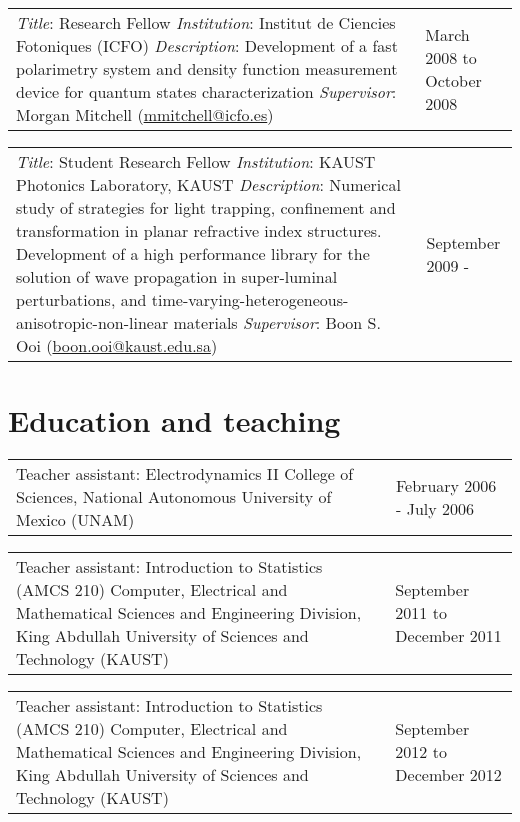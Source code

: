 \documentclass[margin,10pt]{res}
\newcommand{\subs}[1]{\normalfont #1}
\newcommand{\secs}[1]{\normalsize{\section{\subs{#1}}}}
\newcommand{\UNAM}{National Autonomous University of Mexico (UNAM)}
\newcommand{\KAUST}{King Abdullah University of Sciences and Technology (KAUST)}
\begin{document}
\begin{tabular}{p{3.8in} l}
 \emph{Title}: Research Fellow \newline  \emph{Institution}: Institut de Ciencies Fotoniques (ICFO) \newline \emph{Description}: Development of a fast polarimetry system and density function measurement device for quantum states characterization \newline \emph{Supervisor}: Morgan Mitchell (\href{mailto:mmitchell@icfo.es}{mmitchell@icfo.es}) \newline & March 2008 to October 2008
\end{tabular}

\begin{tabular}{p{3.8in} l}
 \emph{Title}: Student Research Fellow \newline \emph{Institution}: KAUST Photonics Laboratory, KAUST \newline \emph{Description}: Numerical study of strategies for light trapping, confinement and transformation in planar refractive index structures. Development of a high performance library for the solution of wave propagation in super-luminal perturbations, and time-varying-heterogeneous-anisotropic-non-linear materials \newline \emph{Supervisor}: Boon S. Ooi (\href{mailto:boon.ooi@kaust.edu.sa}{boon.ooi@kaust.edu.sa}) \newline & September 2009 -  
\end{tabular}


\secs{Education and teaching}
\begin{tabular}{p{3.8in} l}
Teacher assistant: Electrodynamics II \newline College of Sciences, \UNAM \newline & February 2006 - July 2006
\end{tabular}

\begin{tabular}{p{3.8in} l}
Teacher assistant: Introduction to Statistics (AMCS 210) \newline Computer, Electrical and Mathematical Sciences and Engineering Division, \KAUST \newline & September 2011 to December 2011
\end{tabular}

\begin{tabular}{p{3.8in} l}
Teacher assistant: Introduction to Statistics (AMCS 210) \newline Computer, Electrical and Mathematical Sciences and Engineering Division, \KAUST \newline &  September 2012 to December 2012
\end{tabular}
\end{document}
